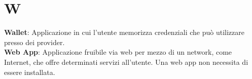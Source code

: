 \section{W}
\textbf{Wallet}: Applicazione in cui l'utente memorizza credenziali che può utilizzare presso dei provider.\\ %
\textbf{Web App}: Applicazione fruibile via web per mezzo di un network, come Internet, che offre determinati servizi all'utente. Una web app non necessita di essere installata.